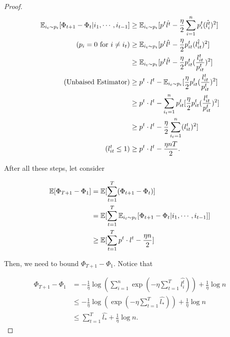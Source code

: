 \documentclass[../main.tex]{subfiles}
\begin{document}
\begin{proof}
	\begin{equation*}
		\begin{aligned}
			 \mathbb{E}_{i_t\sim p_t} [\Phi_{t+1} - \Phi_t | i_1, \cdots, i_{t-1}] 
								  & \geq \mathbb{E}_{i_t\sim p_t} [p^t \hat{l^t} - \frac{\eta}{2} \sum\limits_{i=1}^n p_i^t (\hat{l_i^t})^2] \\
							(p_{i} = 0 \textmd{ for } i \neq i_t)	  & \geq \mathbb{E}_{i_t\sim p_t} [p^t \hat{l^t} - \frac{\eta}{2} p_{it}^t (\hat{l_{it}^t})^2] \\
							 & \geq \mathbb{E}_{i_t\sim p_t} [p^t \hat{l^t} - \frac{\eta}{2} p_{it}^t (\frac{l^t_{it}}{p_{it}^t})^2] \\
							 (\textmd{Unbaised Estimator}) & \geq p^t \cdot l^t -  \mathbb{E}_{i_t\sim p_t}[\frac{\eta}{2} p_{it}^t (\frac{l^t_{it}}{p_{it}^t})^2] \\
							 & \geq p^t \cdot l^t -  \sum\limits_{i_t=1}^n p^t_{it} [\frac{\eta}{2} p_{it}^t (\frac{l^t_{it}}{p_{it}^t})^2] \\
		 					 & \geq p^t \cdot l^t -  \frac{\eta}{2} \sum\limits_{i_t=1}^n  (l^t_{it})^2] \\
		 					(l^t_{it} \leq 1)  &  \geq p^t \cdot l^t -  \frac{\eta n T}{2}.
		\end{aligned}
	\end{equation*}
	
	After all these steps, let consider 
	
	\begin{equation*}
		\begin{aligned}
			\mathbb{E} [\Phi_{T+1} - \Phi_1] & =  \mathbb{E} [ \sum\limits_{t=1}^T(\Phi_{t+1} - \Phi_t)] \\
									  & =   \mathbb{E} [ \sum\limits_{t=1}^T \mathbb{E}_{i_t\sim p_t} [\Phi_{t+1} - \Phi_t | i_1, \cdots, i_{t-1}]] \\
									  & \geq \mathbb{E} [ \sum\limits_{t=1}^T p^t \cdot l^t -  \frac{\eta n }{2} ] 
		\end{aligned}
	\end{equation*}
	
	Then, we need to bound $\Phi_{T+1} - \Phi_1$. Notice that 
	
	\begin{equation*}
		\begin{aligned}
			\Phi_{T+1} - \Phi_1 & = -\frac{1}{\eta} \log (\sum\limits_{i=1}^n \exp(-\eta \sum\limits_{t=1}^T \hat{l_i^t})) + \frac{1}{\eta} \log n \\
								& \leq -\frac{1}{\eta} \log (\exp(-\eta \sum\limits_{t=1}^T\hat{l_*})) + \frac{1}{\eta} \log n \\
								& \leq \sum\limits_{t=1}^T\hat{l_*} + \frac{1}{\eta} \log n.
		\end{aligned}
	\end{equation*}
	

\end{proof}
\end{document}
